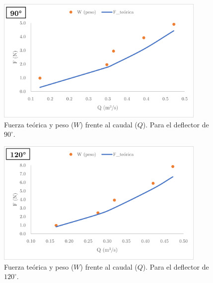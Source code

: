\documentclass[12pt,a4paper]{article}
\newcommand{\grad}{^{\circ}}
\begin{document}
\begin{figure}[H]
 	 \begin{center}
  \includegraphics[width=0.9\textwidth]{fotos/Picture1}
  	 \end{center}
  	 \vspace{-0.3cm}
  	\caption{Fuerza teórica y peso ($W$) frente al caudal ($Q$). Para el deflector de $90\grad$.}
  	\label{fig12}
  	\vspace{-0.2cm}
\end{figure}

\begin{figure}[H]
 	 \begin{center}
  \includegraphics[width=0.9\textwidth]{fotos/Picture2}
  	 \end{center}
  	 \vspace{-0.3cm}
  	\caption{Fuerza teórica y peso ($W$) frente al caudal ($Q$). Para el deflector de $120\grad$.}
  	\label{fig13}
  	\vspace{-0.2cm}
\end{figure}
\end{document}
